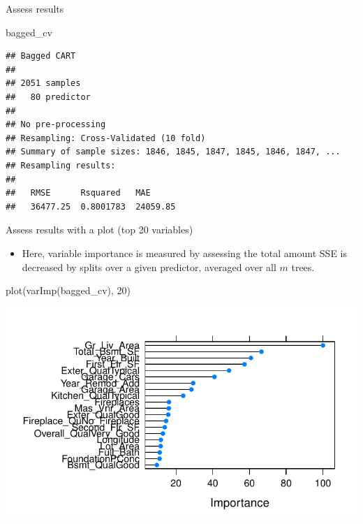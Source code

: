 \documentclass[
  10pt,
  ignorenonframetext,
]{beamer}
\newenvironment{Shaded}{}{}
\newcommand{\DecValTok}[1]{#1}
\newcommand{\KeywordTok}[1]{\textcolor[rgb]{0.00,0.00,1.00}{#1}}
\newcommand{\NormalTok}[1]{#1}
\providecommand{\tightlist}{%
  \setlength{\itemsep}{0pt}\setlength{\parskip}{0pt}}
\begin{document}
\begin{frame}[fragile]{Assess results}
\protect\hypertarget{assess-results}{}

\begin{Shaded}
\begin{Highlighting}[]
\NormalTok{bagged_cv}
\end{Highlighting}
\end{Shaded}

\begin{verbatim}
## Bagged CART 
## 
## 2051 samples
##   80 predictor
## 
## No pre-processing
## Resampling: Cross-Validated (10 fold) 
## Summary of sample sizes: 1846, 1845, 1847, 1845, 1846, 1847, ... 
## Resampling results:
## 
##   RMSE      Rsquared   MAE     
##   36477.25  0.8001783  24059.85
\end{verbatim}

\end{frame}

\begin{frame}[fragile]{Assess results with a plot (top 20 variables)}
\protect\hypertarget{assess-results-with-a-plot-top-20-variables}{}

\begin{itemize}
\tightlist
\item
  Here, variable importance is measured by assessing the total amount
  SSE is decreased by splits over a given predictor, averaged over all
  \(m\) trees.
\end{itemize}

\begin{Shaded}
\begin{Highlighting}[]
\KeywordTok{plot}\NormalTok{(}\KeywordTok{varImp}\NormalTok{(bagged_cv), }\DecValTok{20}\NormalTok{) }
\end{Highlighting}
\end{Shaded}

\includegraphics{c1_trees_bagging_files/figure-beamer/unnamed-chunk-30-1.pdf}

\end{frame}
\end{document}
